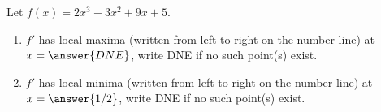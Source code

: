 \documentclass{ximera}
\author{Gregory Hartman \and Matthew Carr}
\begin{document}
\begin{exercise}






Let $f(x)=2x^3-3x^2+9x+5$.
\begin{enumerate}
\item		$f'$ has local maxima (written from left to right on the number line) at $x=\answer{DNE}$, write DNE if no such point(s) exist.
\item		$f'$ has local minima (written from left to right on the number line) at $x=\answer{1/2}$, write DNE if no such point(s) exist.
\end{enumerate}

\end{exercise}
\end{document}
